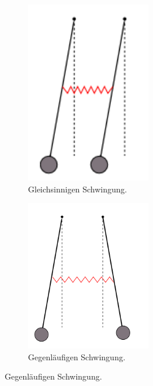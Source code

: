 \begin{figure}
    \centering
    \begin{subfigure}[b]{0.3\textwidth}
        \centering
        \includegraphics[width=0.6\textwidth]{bilder/gleich.png}
        \caption{Gleichsinnigen Schwingung.}
        \label{fig:4}
    \end{subfigure}
    \hfill
    \begin{subfigure}[b]{0.3\textwidth}
        \centering
         \includegraphics[width=0.6\textwidth]{bilder/gegen.png}
        \caption{Gegenläufigen Schwingung.}
        \label{fig:5}
    \end{subfigure}

\end{figure}
